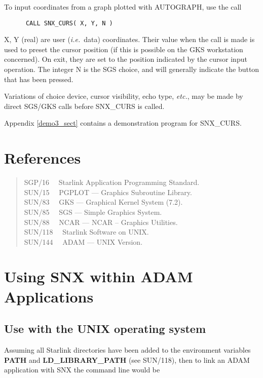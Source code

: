 To input coordinates from a graph plotted with AUTOGRAPH, use the call

\begin{verbatim}
      CALL SNX_CURS( X, Y, N )
\end{verbatim}

X, Y (real) are user ({\em i.e.}\ data) coordinates.
Their value when the call is made is used to preset the cursor
position (if this is possible on the GKS workstation concerned).
On exit, they are set to the position indicated by the
cursor input operation.
The integer N is the SGS choice, and will generally indicate the button
that has been pressed.

Variations of choice device, cursor visibility, echo type,
{\em etc.}, may be made by direct SGS/GKS calls before SNX\_CURS is called.

Appendix \ref{demo3_sect} contains a demonstration program for SNX\_CURS.


\section {References}

\begin{verse}
SGP/16 ~~Starlink Application Programming Standard.\\
SUN/15 ~~PGPLOT --- Graphics Subroutine Library.\\
SUN/83 ~~GKS --- Graphical Kernel System (7.2).\\
SUN/85 ~~SGS --- Simple Graphics System.\\
SUN/88 ~~NCAR --- NCAR -- Graphics Utilities.\\
SUN/118 ~~Starlink Software on UNIX.\\
SUN/144 ~~ADAM --- UNIX Version.
\end{verse}


\newpage
\appendix
\section {Using SNX within ADAM Applications} \label{adam_link}

\subsection {Use with the UNIX operating system}

\begin{sloppypar}
Assuming all Starlink directories have been added to the environment variables
{\bf PATH} and {\bf LD\_LIBRARY\_PATH} (see SUN/118), then to link an ADAM
application with SNX the command line would be
\end{sloppypar}

